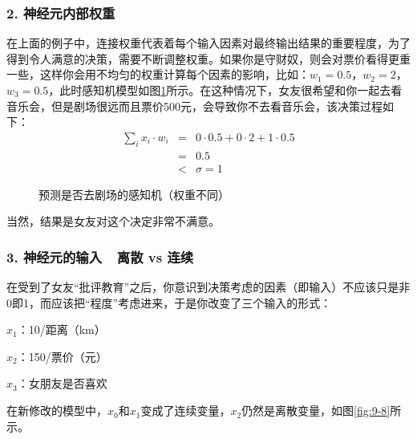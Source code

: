 \vspace{-1em}
\subsubsection{2. 神经元内部权重}

\parinterval 在上面的例子中，连接权重代表着每个输入因素对最终输出结果的重要程度，为了得到令人满意的决策，需要不断调整权重。如果你是守财奴，则会对票价看得更重一些，这样你会用不均匀的权重计算每个因素的影响，比如：$ w_1=0.5 $，$ w_2=2 $，$ w_3=0.5 $，此时感知机模型如图\ref{fig:9-7}所示。在这种情况下，女友很希望和你一起去看音乐会，但是剧场很远而且票价500元，会导致你不去看音乐会，该决策过程如下：
\begin{eqnarray}
\sum_{i}{x_i\cdot w_i} & = & 0\cdot 0.5+0\cdot 2+1\cdot 0.5 \nonumber \\
                                   & = & 0.5 \nonumber \\
                                   & < & \sigma = 1
\label{eq:9-21}
\end{eqnarray}

\begin{figure}[htp]
\centering

\caption{预测是否去剧场的感知机（权重不同）}
\label{fig:9-7}
\end{figure}

\parinterval 当然，结果是女友对这个决定非常不满意。


\subsubsection{3. 神经元的输入\ \dash \ 离散 vs 连续}

\parinterval 在受到了女友“批评教育”之后，你意识到决策考虑的因素（即输入）不应该只是非0即1，而应该把“程度”考虑进来，于是你改变了三个输入的形式：

\parinterval $ x_1 $：10/距离（km）

\parinterval $ x_2 $：150/票价（元）

\parinterval $ x_3 $：女朋友是否喜欢

\parinterval 在新修改的模型中，$ x_0 $和$ x_1 $变成了连续变量，$ x_2 $仍然是离散变量，如图\ref{fig:9-8}所示。

